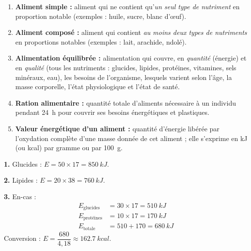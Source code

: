 \documentclass[11pt]{article}
\begin{document}
\begin{corrige}
\begin{enumerate}
\item \textbf{Aliment simple :} aliment qui ne contient qu'\emph{un seul type de nutriment} en proportion notable (exemples : huile, sucre, blanc d'œuf).
\item \textbf{Aliment composé :} aliment qui contient \emph{au moins deux types de nutriments} en proportions notables (exemples : lait, arachide, ndolé).
\item \textbf{Alimentation équilibrée :} alimentation qui couvre, en \emph{quantité} (énergie) et en \emph{qualité} (tous les nutriments : glucides, lipides, protéines, vitamines, sels minéraux, eau), les besoins de l'organisme, lesquels varient selon l'âge, la masse corporelle, l'état physiologique et l'état de santé.
\item \textbf{Ration alimentaire :} quantité totale d'aliments nécessaire à un individu pendant \SI{24}{h} pour couvrir ses besoins énergétiques et plastiques.
\item \textbf{Valeur énergétique d'un aliment :} quantité d'énergie libérée par l'oxydation complète d'une masse donnée de cet aliment ; elle s'exprime en kJ (ou kcal) par gramme ou par \SI{100}{g}.
\end{enumerate}
\end{corrige}

\begin{corrige}
\textbf{1.} Glucides : $E = 50 \times 17 = \SI{850}{kJ}$.

\textbf{2.} Lipides : $E = 20 \times 38 = \SI{760}{kJ}$.

\textbf{3.} En-cas :
\begin{align*}
E_{\text{glucides}} &= 30 \times 17 = \SI{510}{kJ}\\
E_{\text{protéines}} &= 10 \times 17 = \SI{170}{kJ}\\
E_{\text{totale}} &= 510 + 170 = \SI{680}{kJ}
\end{align*}
Conversion : $E = \dfrac{680}{4{,}18} \approx \SI{162,7}{kcal}$.
\end{corrige}
\end{document}
